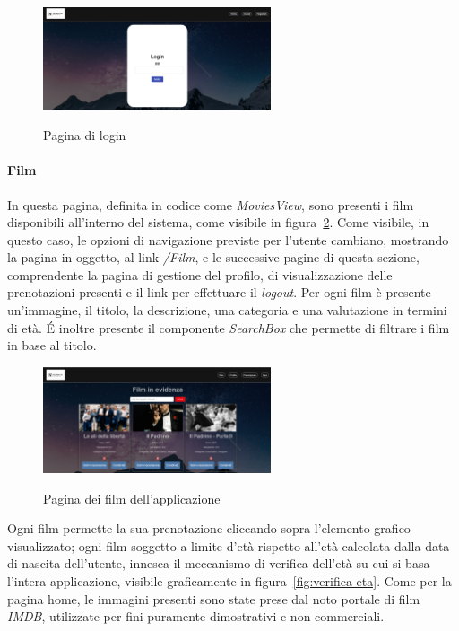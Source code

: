 \begin{figure}[ht]
    \centering
    \includegraphics[width=0.6\textwidth, alt={Pagina di accesso all'applicazione}]{immagini/frontend/login.png}
    \caption{Pagina di login}\label{fig:pagina-login}
\end{figure}

\paragraph{Film}\label{par:film}

In questa pagina, definita in codice come \textit{MoviesView}, sono presenti i film disponibili all'interno del sistema, come visibile in figura~\ref{fig:pagina-film}.
Come visibile, in questo caso, le opzioni di navigazione previste per l'utente cambiano, mostrando la pagina in oggetto, al link \textit{/Film},
e le successive pagine di questa sezione, comprendente la pagina di gestione del profilo, di visualizzazione delle prenotazioni presenti e il link per effettuare il \textit{logout}.
Per ogni film è presente un'immagine, il titolo, la descrizione, una categoria e una valutazione in termini di età.
É inoltre presente il componente \textit{SearchBox} che permette di filtrare i film in base al titolo.

\begin{figure}[ht]
    \centering
    \includegraphics[width=0.6\textwidth, alt={Pagina contenente i film dell'applicazione}]{immagini/frontend/movies.png}
    \caption{Pagina dei film dell'applicazione}\label{fig:pagina-film}
\end{figure}

Ogni film permette la sua prenotazione cliccando sopra l'elemento grafico visualizzato; ogni film soggetto a limite d'età rispetto all'età
calcolata dalla data di nascita dell'utente, innesca il meccanismo di verifica dell'età su cui si basa l'intera applicazione, visibile graficamente
in figura~\ref{fig:verifica-eta}.
Come per la pagina home, le immagini presenti sono state prese dal noto portale di film \textit{IMDB}, utilizzate per fini puramente dimostrativi e non commerciali.

